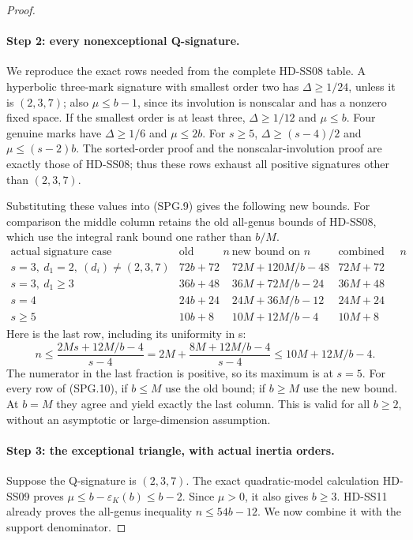 \begin{proof}
\paragraph{Step 2: every nonexceptional Q-signature.}
We reproduce the exact rows needed from the complete HD-SS08 table.
A hyperbolic three-mark signature with smallest order two has
\(\Delta\ge1/24\), unless it is \((2,3,7)\); also
\(\mu\le b-1\), since its involution is nonscalar and has a
nonzero fixed space.  If the smallest order is at least three,
\(\Delta\ge1/12\) and \(\mu\le b\).  Four genuine marks
have \(\Delta\ge1/6\) and \(\mu\le2b\).  For \(s\ge5\),
\(\Delta\ge(s-4)/2\) and \(\mu\le(s-2)b\).
The sorted-order proof and the nonscalar-involution proof are exactly
those of HD-SS08; thus these rows exhaust all positive signatures
other than \((2,3,7)\).

Substituting these values into (SPG.9) gives the following new bounds.
For comparison the middle column retains the old all-genus bounds of
HD-SS08, which use the integral rank bound one rather than \(b/M\).
\[
\begin{array}{c|c|c|c}
\text{actual signature case}
 &\text{old bound on }n&\text{new bound on }n
 &\text{combined bound on }n\\ \hline
s=3,\ d_1=2,\ (d_i)\ne(2,3,7)
 &72b+72&72M+120M/b-48&72M+72\\
s=3,\ d_1\ge3
 &36b+48&36M+72M/b-24&36M+48\\
s=4
 &24b+24&24M+36M/b-12&24M+24\\
s\ge5
 &10b+8&10M+12M/b-4&10M+8
\end{array}
 \tag{SPG.10}
\]
Here is the last row, including its uniformity in s:
\[
 n\le\frac{2Ms+12M/b-4}{s-4}
   =2M+\frac{8M+12M/b-4}{s-4}
   \le10M+12M/b-4.
 \tag{SPG.11}
\]
The numerator in the last fraction is positive, so its maximum is
at \(s=5\).  For every row of (SPG.10), if \(b\le M\) use
the old bound; if \(b\ge M\) use the new bound.  At \(b=M\)
they agree and yield exactly the last column.  This is valid for
all \(b\ge2\), without an asymptotic or large-dimension assumption.

\paragraph{Step 3: the exceptional triangle, with actual inertia orders.}
Suppose the Q-signature is \((2,3,7)\).  The exact quadratic-model
calculation HD-SS09 proves \(\mu\le b-\varepsilon_K(b)\le b-2\).
Since \(\mu>0\), it also gives \(b\ge3\).
HD-SS11 already proves the all-genus inequality \(n\le54b-12\).
We now combine it with the support denominator.


\end{proof}
